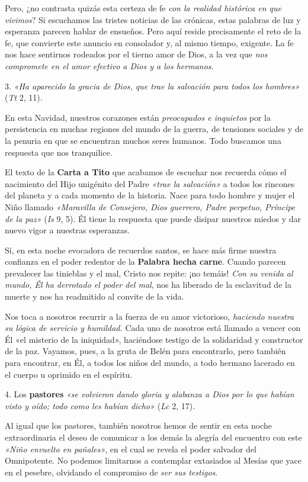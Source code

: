 \documentclass[]{article}
\begin{document}
Pero, ¿no contrasta quizás esta certeza de fe \emph{con la realidad
histórica en que vivimos}? Si escuchamos las tristes noticias de las
crónicas, estas palabras de luz y esperanza parecen hablar de ensueños.
Pero aquí reside precisamente el reto de la fe, que convierte este
anuncio en consolador y, al mismo tiempo, exigente. La fe nos hace
sentirnos rodeados por el tierno amor de Dios, a la vez que \emph{nos
compromete en el amor efectivo a Dios y a los hermanos}.

3. \emph{«Ha aparecido la gracia de Dios, que trae la salvación para
todos los hombres»} (\emph{Tt} 2, 11).

En esta Navidad, nuestros corazones están \emph{preocupados e inquietos}
por la persistencia en muchas regiones del mundo de la guerra, de
tensiones sociales y de la penuria en que se encuentran muchos seres
humanos. Todo buscamos una respuesta que nos tranquilice.

El texto de la \textbf{Carta a Tito} que acabamos de escuchar nos
recuerda cómo el nacimiento del Hijo unigénito del Padre \emph{«trae la
salvación»} a todos los rincones del planeta y a cada momento de la
historia. Nace para todo hombre y mujer el Niño llamado \emph{«Maravilla
de Consejero, Dios guerrero, Padre perpetuo, Príncipe de la paz»}
(\emph{Is} 9, 5). Él tiene la respuesta que puede disipar nuestros
miedos y dar nuevo vigor a nuestras esperanzas.

Sí, en esta noche evocadora de recuerdos santos, se hace más firme
nuestra confianza en el poder redentor de la \textbf{Palabra hecha
carne}. Cuando parecen prevalecer las tinieblas y el mal, Cristo nos
repite: ¡no temáis! \emph{Con su venida al mundo, Él ha derrotado el
poder del mal}, nos ha liberado de la esclavitud de la muerte y nos ha
readmitido al convite de la vida.

Nos toca a nosotros recurrir a la fuerza de su amor victorioso,
\emph{haciendo nuestra su lógica de servicio y humildad.} Cada uno de
nosotros está llamado a vencer con Él «el misterio de la iniquidad»,
haciéndose testigo de la solidaridad y constructor de la paz. Vayamos,
pues, a la gruta de Belén para encontrarlo, pero también para encontrar,
en Él, a todos los niños del mundo, a todo hermano lacerado en el cuerpo
u oprimido en el espíritu.

4. Los \textbf{pastores} \emph{«se volvieron dando gloria y alabanza a
Dios por lo que habían visto y oído; todo como les habían dicho»}
(\emph{Lc} 2, 17).

Al igual que los pastores, también nosotros hemos de sentir en esta
noche extraordinaria el deseo de comunicar a los demás la alegría del
encuentro con este \emph{«Niño envuelto en pañales»}, en el cual se
revela el poder salvador del Omnipotente. No podemos limitarnos a
contemplar extasiados al Mesías que yace en el pesebre, olvidando el
compromiso de \emph{ser sus testigos}.
\end{document}
